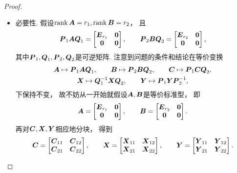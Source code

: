 \begin{example}
\begin{proof}
\begin{itemize}
	\item 必要性.
	假设\(\rank \boldsymbol{A}=r_1,
	\rank \boldsymbol{B}=r_2\)，
	且\begin{equation*}
		\boldsymbol{P}_1 \boldsymbol{A} \boldsymbol{Q}_1
		= \begin{bmatrix}
			\boldsymbol{E}_{r_1} & \boldsymbol0 \\
			\boldsymbol0 & \boldsymbol0
		\end{bmatrix},
		\qquad
		\boldsymbol{P}_2 \boldsymbol{B} \boldsymbol{Q}_2
		= \begin{bmatrix}
			\boldsymbol{E}_{r_2} & \boldsymbol0 \\
			\boldsymbol0 & \boldsymbol0
		\end{bmatrix},
	\end{equation*}
	其中\(\boldsymbol{P}_1,\boldsymbol{Q}_1,\boldsymbol{P}_2,\boldsymbol{Q}_2\)是可逆矩阵.
	注意到问题的条件和结论在等价变换\begin{gather*}
		\boldsymbol{A} \mapsto \boldsymbol{P}_1 \boldsymbol{A} \boldsymbol{Q}_1, \qquad
		\boldsymbol{B} \mapsto \boldsymbol{P}_2 \boldsymbol{B} \boldsymbol{Q}_2, \qquad
		\boldsymbol{C} \mapsto \boldsymbol{P}_1 \boldsymbol{C} \boldsymbol{Q}_2, \\
		\boldsymbol{X} \mapsto \boldsymbol{Q}_1^{-1} \boldsymbol{X} \boldsymbol{Q}_2, \qquad
		\boldsymbol{Y} \mapsto \boldsymbol{P}_1 \boldsymbol{Y} \boldsymbol{P}_2^{-1},
	\end{gather*}
	下保持不变，
	故不妨从一开始就假设\(\boldsymbol{A},\boldsymbol{B}\)是等价标准型，
	即\begin{equation*}
		\boldsymbol{A} = \begin{bmatrix}
			\boldsymbol{E}_{r_1} & \boldsymbol0 \\
			\boldsymbol0 & \boldsymbol0
		\end{bmatrix}, \qquad
		\boldsymbol{B} = \begin{bmatrix}
			\boldsymbol{E}_{r_2} & \boldsymbol0 \\
			\boldsymbol0 & \boldsymbol0
		\end{bmatrix}.
	\end{equation*}
	再对\(\boldsymbol{C},\boldsymbol{X},\boldsymbol{Y}\)相应地分块，
	得到\begin{equation*}
		\boldsymbol{C} = \begin{bmatrix}
			\boldsymbol{C}_{11} & \boldsymbol{C}_{12} \\
			\boldsymbol{C}_{21} & \boldsymbol{C}_{22}
		\end{bmatrix},
		\qquad
		\boldsymbol{X} = \begin{bmatrix}
			\boldsymbol{X}_{11} & \boldsymbol{X}_{12} \\
			\boldsymbol{X}_{21} & \boldsymbol{X}_{22}
		\end{bmatrix},
		\qquad
		\boldsymbol{Y} = \begin{bmatrix}
			\boldsymbol{Y}_{11} & \boldsymbol{Y}_{12} \\
			\boldsymbol{Y}_{21} & \boldsymbol{Y}_{22}
		\end{bmatrix}.
	\end{equation*}

\end{itemize}
\end{proof}
\end{example}
